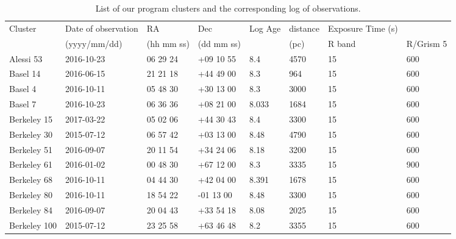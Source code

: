 \documentclass{jaa}
\begin{document}
\begin{table*}
\caption{List of our program clusters and the corresponding log of observations.}\label{Table:1}
\begin{tabular}{llllllll} \hline
Cluster & Date of observation & RA & Dec & Log Age & distance & Exposure Time (s) &      \\
       & (yyyy/mm/dd)           & (hh mm ss)      & (dd mm ss)       &     & (pc)        & R band      & R/Grism 5 \\ \hline
Alessi 53        & 2016-10-23          & 06 29 24      & +09 10 55      & 8.4       & 4570          & 15          & 600           \\
Basel 14        & 2016-06-15          & 21 21 18      & +44 49 00      & 8.3       & 964           & 15          & 600           \\
Basel 4         & 2016-10-11          & 05 48 30      & +30 13 00      & 8.3       & 3000          & 15          & 600           \\
Basel 7         & 2016-10-23          & 06 36 36      & +08 21 00      & 8.033      & 1684          & 15          & 600           \\
Berkeley 15       & 2017-03-22          & 05 02 06      & +44 30 43      & 8.4       & 3300          & 15          & 600           \\
Berkeley 30       & 2015-07-12          & 06 57 42      & +03 13 00      & 8.48       & 4790          & 15          & 600           \\
Berkeley 51       & 2016-09-07          & 20 11 54      & +34 24 06      & 8.18       & 3200          & 15          & 600           \\
Berkeley 61       & 2016-01-02          & 00 48 30      & +67 12 00      & 8.3       & 3335          & 15          & 900           \\
Berkeley 68       & 2016-10-11          & 04 44 30      & +42 04 00      & 8.391      & 1678          & 15          & 600           \\
Berkeley 80       & 2016-10-11          & 18 54 22      & -01 13 00      & 8.48       & 3300          & 15          & 600           \\
Berkeley 84       & 2016-09-07          & 20 04 43      & +33 54 18      & 8.08       & 2025          & 15          & 600           \\
Berkeley 100       & 2015-07-12          & 23 25 58      & +63 46 48      & 8.2       & 3355          & 15          & 600           \\

\end{tabular}
\end{table*}
\end{document}
